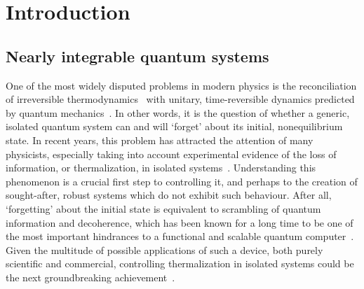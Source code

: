 \chapter{Introduction\label{chap:intro}}
\thispagestyle{chapterBeginStyle}

\section{Nearly integrable quantum systems}
One of the most widely disputed problems in modern physics is the reconciliation
of irreversible thermodynamics~\autocite{huang1987statistical,feynman1998statistical}
with unitary, time-reversible dynamics predicted by quantum mechanics~\autocite{Landau1976,Sakurai2017}.
In other words, it is the question of whether a generic, isolated quantum system can and will `forget' about its
initial, nonequilibrium state. In recent years, this problem has attracted the attention of many physicists,
especially taking into account experimental evidence of the loss of information, or thermalization, in isolated
systems~\autocite{Trotzky2012325,Rigol2012,Rigol2008854,Hung2010,Hofferberth2007}. Understanding this phenomenon is a crucial first step to
controlling it, and perhaps to the creation of sought-after, robust systems which do not exhibit such
behaviour. After all, `forgetting' about the initial state is equivalent to scrambling of quantum information
and decoherence, which has been known for a long time to be one of the most important hindrances 
to a functional and scalable quantum computer~\autocite{Shor1995,LewisSwan2019}. Given the multitude
of possible applications of such a device, both purely scientific and commercial, controlling thermalization
in isolated systems could be the next groundbreaking achievement~\autocite{MacQuarrie2020}.
 
